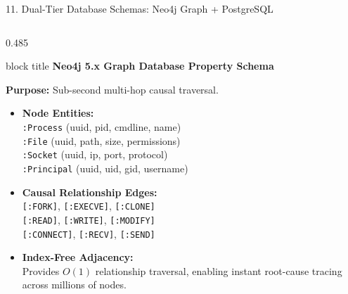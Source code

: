 \documentclass[aspectratio=169,10pt]{beamer}
\begin{document}
\begin{frame}{11. Dual-Tier Database Schemas: Neo4j Graph + PostgreSQL}
\vspace{-0.2em}
\begin{columns}[T]
\begin{column}{0.485\textwidth}
\begin{beamercolorbox}[rounded=true,shadow=false,sep=0.30em,wd=\linewidth]{block title}
\textbf{\scriptsize Neo4j 5.x Graph Database Property Schema}
\end{beamercolorbox}
\vspace{0.12em}
{\fontsize{7.0pt}{9.8pt}\selectfont
\textbf{Purpose:} Sub-second multi-hop causal traversal.
\begin{itemize}\itemsep0.20em
  \item \textbf{Node Entities:}\\
  \texttt{:Process} (uuid, pid, cmdline, name)\\
  \texttt{:File} (uuid, path, size, permissions)\\
  \texttt{:Socket} (uuid, ip, port, protocol)\\
  \texttt{:Principal} (uuid, uid, gid, username)
  \item \textbf{Causal Relationship Edges:}\\
  \texttt{[:FORK]}, \texttt{[:EXECVE]}, \texttt{[:CLONE]}\\
  \texttt{[:READ]}, \texttt{[:WRITE]}, \texttt{[:MODIFY]}\\
  \texttt{[:CONNECT]}, \texttt{[:RECV]}, \texttt{[:SEND]}
  \item \textbf{Index-Free Adjacency:}\\
  Provides $O(1)$ relationship traversal, enabling instant root-cause tracing across millions of nodes.
\end{itemize}
}
\end{column}


\end{columns}
\end{frame}
\end{document}
